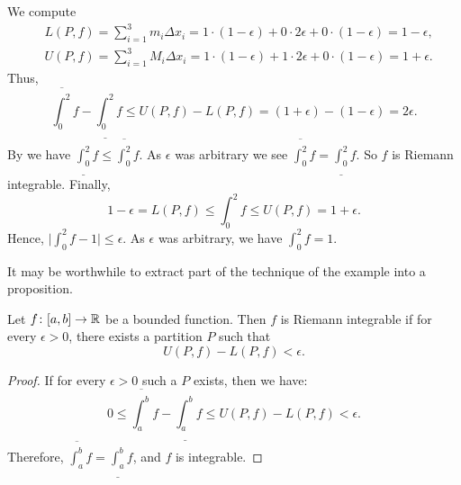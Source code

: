 \begin{example}
We compute
\begin{align*}
& L(P,f) = \sum_{i=1}^3 m_i \Delta x_i =
1 \cdot (1-\epsilon) + 0 \cdot 2\epsilon + 0 \cdot (1-\epsilon)
= 1-\epsilon , \\
& U(P,f) = \sum_{i=1}^3 M_i \Delta x_i =
1 \cdot (1-\epsilon) + 1 \cdot 2\epsilon + 0 \cdot (1-\epsilon)
= 1+\epsilon .
\end{align*}
Thus,
\begin{equation*}
\overline{\int_0^2} f - 
\underline{\int_0^2} f
\leq
U(P,f) - L(P,f)
=
(1+\epsilon)
- (1-\epsilon) = 2 \epsilon .
\end{equation*}
By  we have $\underline{\int_0^2} f \leq \overline{\int_0^2} f$.
As $\epsilon$ was arbitrary we see 
$\overline{\int_0^2} f = \underline{\int_0^2} f$.  So $f$ is Riemann
integrable.  Finally,
\begin{equation*}
1-\epsilon = L(P,f) \leq \int_0^2 f \leq U(P,f) =
1+\epsilon.
\end{equation*}
Hence, $\bigl\lvert \int_0^2 f - 1 \bigr\rvert \leq \epsilon$.  As $\epsilon$ was arbitrary,
we have $\int_0^2 f = 1$.
\end{example}

It may be worthwhile to extract part of the technique of the example into a
proposition.

\begin{prop}
Let $f \colon [a,b] \to {\mathbb{R}}$ be a bounded function.  Then $f$ is Riemann
integrable if for every $\epsilon > 0$, there exists a partition $P$ such that
\begin{equation*}
U(P,f) - L(P,f) < \epsilon .
\end{equation*}
\end{prop}

\begin{proof}
If for every $\epsilon > 0$ such a $P$ exists, then we have:
\begin{equation*}
0 \leq
\overline{\int_a^b} f - 
\underline{\int_a^b} f
\leq
U(P,f) - L(P,f) < \epsilon .
\end{equation*}
Therefore, 
$\overline{\int_a^b} f = \underline{\int_a^b} f$, and $f$ is integrable.
\end{proof}

